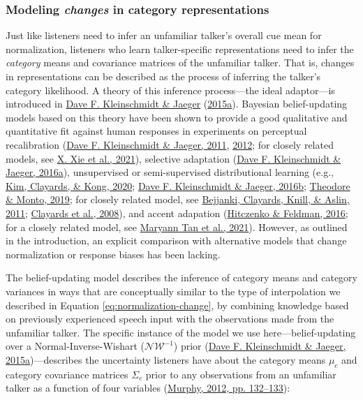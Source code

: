 \documentclass[
  11pt,
  english,
  man,floatsintext]{apa6}
\begin{document}
\hypertarget{sec:ideal-adaptor}{%
\subsubsection{\texorpdfstring{Modeling \emph{changes} in category representations}{Modeling changes in category representations}}\label{sec:ideal-adaptor}}

Just like listeners need to infer an unfamiliar talker's overall cue mean for normalization, listeners who learn talker-specific representations need to infer the \emph{category} means and covariance matrices of the unfamiliar talker. That is, changes in representations can be described as the process of inferring the talker's category likelihood. A theory of this inference process---the ideal adaptor---is introduced in \protect\hyperlink{ref-kleinschmidt-jaeger2015}{Dave F. Kleinschmidt \& Jaeger} (\protect\hyperlink{ref-kleinschmidt-jaeger2015}{2015a}). Bayesian belief-updating models based on this theory have been shown to provide a good qualitative and quantitative fit against human responses in experiments on perceptual recalibration (\protect\hyperlink{ref-kleinschmidt-jaeger2011}{Dave F. Kleinschmidt \& Jaeger, 2011}, \protect\hyperlink{ref-kleinschmidt-jaeger2012}{2012}; for closely related models, see \protect\hyperlink{ref-xie2021cognition}{X. Xie et al., 2021}), selective adaptation (\protect\hyperlink{ref-kleinschmidt-jaeger2016pbr}{Dave F. Kleinschmidt \& Jaeger, 2016a}), unsupervised or semi-supervised distributional learning (e.g., \protect\hyperlink{ref-kim2020}{Kim, Clayards, \& Kong, 2020}; \protect\hyperlink{ref-kleinschmidt-jaeger2016cogsci}{Dave F. Kleinschmidt \& Jaeger, 2016b}; \protect\hyperlink{ref-theodore-monto2019}{Theodore \& Monto, 2019}; for closely related model, see \protect\hyperlink{ref-bejjanki2011}{Bejjanki, Clayards, Knill, \& Aslin, 2011}; \protect\hyperlink{ref-clayards2008}{Clayards et al., 2008}), and accent adapation (\protect\hyperlink{ref-hitczenko-feldman2016}{Hitczenko \& Feldman, 2016}; for a closely related model, see \protect\hyperlink{ref-tan2021}{Maryann Tan et al., 2021}). However, as outlined in the introduction, an explicit comparison with alternative models that change normalization or response biases has been lacking.

The belief-updating model describes the inference of category means and category variances in ways that are conceptually similar to the type of interpolation we described in Equation \eqref{eq:normalization-change}, by combining knowledge based on previously experienced speech input with the observations made from the unfamiliar talker. The specific instance of the model we use here---belief-updating over a Normal-Inverse-Wishart (\(\mathcal{NW^{-1}}\)) prior (\protect\hyperlink{ref-kleinschmidt-jaeger2015}{Dave F. Kleinschmidt \& Jaeger, 2015a})---describes the uncertainty listeners have about the category means \(\mu_c\) and category covariance matrices \(\Sigma_c\) prior to any observations from an unfamiliar talker as a function of four variables (\protect\hyperlink{ref-murphy2012}{Murphy, 2012, pp. 132--133}):
\end{document}
